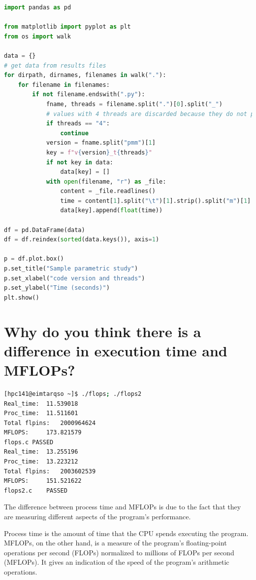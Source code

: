 \documentclass[11pt]{article}
\begin{document}
\begin{lstlisting}[language=Python]
import pandas as pd

from matplotlib import pyplot as plt
from os import walk

data = {}
# get data from results files
for dirpath, dirnames, filenames in walk("."):
    for filename in filenames:
        if not filename.endswith(".py"):
            fname, threads = filename.split(".")[0].split("_")
            # values with 4 threads are discarded because they do not provide enough values
            if threads == "4":
                continue
            version = fname.split("pmm")[1]
            key = f"v{version}_t{threads}"
            if not key in data:
                data[key] = []
            with open(filename, "r") as _file:
                content = _file.readlines()
                time = content[1].split("\t")[1].strip().split("m")[1].rstrip("s")
                data[key].append(float(time))

df = pd.DataFrame(data)
df = df.reindex(sorted(data.keys()), axis=1)

p = df.plot.box()
p.set_title("Sample parametric study")
p.set_xlabel("code version and threads")
p.set_ylabel("Time (seconds)")
plt.show()

\end{lstlisting}

\hypertarget{4}{%
\section{Why do you think there is a difference in execution time and MFLOPs?}\label{4}}

\begin{lstlisting}[language=bash, caption=flops execution]
    [hpc141@eimtarqso ~]$ ./flops; ./flops2
Real_time:	11.539018
Proc_time:	11.511601
Total flpins:	2000964624
MFLOPS:		173.821579
flops.c	PASSED
Real_time:	13.255196
Proc_time:	13.223212
Total flpins:	2003602539
MFLOPS:		151.521622
flops2.c	PASSED
\end{lstlisting}

The difference between process time and MFLOPs is due to the fact that they are measuring different aspects of the program's performance.

Process time is the amount of time that the CPU spends executing the program.  MFLOPs, on the other hand, is a measure of the program's floating-point operations per second (FLOPs) normalized to millions of FLOPs per second (MFLOPs). It gives an indication of the speed of the program's arithmetic operations.
\end{document}
